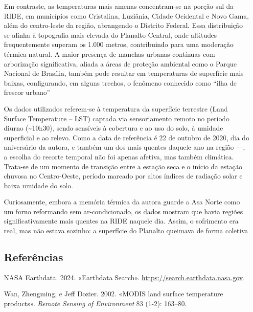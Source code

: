 \documentclass[
  letterpaper,
  DIV=11,
  numbers=noendperiod]{scrartcl}
\newlength{\cslhangindent}
\newenvironment{CSLReferences}[2] %
 {\begin{list}{}{%
  \setlength{\itemindent}{0pt}
  \setlength{\leftmargin}{0pt}
  \setlength{\parsep}{0pt}
  \ifodd #1
   \setlength{\leftmargin}{\cslhangindent}
   \setlength{\itemindent}{-1\cslhangindent}
  \fi
  \setlength{\itemsep}{#2\baselineskip}}}
 {\end{list}}
\begin{document}
Em contraste, as temperaturas mais amenas concentram-se na porção sul da
RIDE, em municípios como Cristalina, Luziânia, Cidade Ocidental e Novo
Gama, além do centro-leste da região, abrangendo o Distrito Federal.
Essa distribuição se alinha à topografia mais elevada do Planalto
Central, onde altitudes frequentemente superam os 1.000 metros,
contribuindo para uma moderação térmica natural. A maior presença de
manchas urbanas contínuas com arborização significativa, aliada a áreas
de proteção ambiental como o Parque Nacional de Brasília, também pode
resultar em temperaturas de superfície mais baixas, configurando, em
alguns trechos, o fenômeno conhecido como ``ilha de frescor urbano''

Os dados utilizados referem-se à temperatura da superfície terrestre
(Land Surface Temperature -- LST) captada via sensoriamento remoto no
período diurno (\textasciitilde10h30), sendo sensíveis à cobertura e ao
uso do solo, à umidade superficial e ao relevo. Como a data de
referência é 22 de outubro de 2020, dia do aniversário da autora, e
também um dos mais quentes daquele ano na região ---, a escolha do
recorte temporal não foi apenas afetiva, mas também climática. Trata-se
de um momento de transição entre a estação seca e o início da estação
chuvosa no Centro-Oeste, período marcado por altos índices de radiação
solar e baixa umidade do solo.

Curiosamente, embora a memória térmica da autora guarde a Asa Norte como
um forno reformando sem ar-condicionado, os dados mostram que havia
regiões significativamente mais quentes na RIDE naquele dia. Assim, o
sofrimento era real, mas não estava sozinho: a superfície do Planalto
queimava de forma coletiva

\subsection*{Referências}\label{referuxeancias}

\label{refs}
\begin{CSLReferences}{1}{0}
NASA Earthdata. 2024. {«Earthdata Search»}.
\url{https://search.earthdata.nasa.gov}.

Wan, Zhengming, e Jeff Dozier. 2002. {«MODIS land surface temperature
products»}. \emph{Remote Sensing of Environment} 83 (1-2): 163--80.

\end{CSLReferences}
\end{document}
